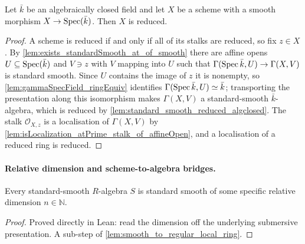 \begin{lemma}
  \label{lem:smooth_scheme_reduced_algclosed}
  Let \(\bar k\) be an algebraically closed field and let \(X\) be a scheme with
  a smooth morphism \(X \to \operatorname{Spec}(\bar k)\). Then \(X\) is reduced.
\end{lemma}

\begin{proof}
  A scheme is reduced if and only if all of its stalks are reduced, so fix
  \(z \in X\). By \cref{lem:exists_standardSmooth_at_of_smooth} there are affine
  opens \(U \subseteq \operatorname{Spec}(\bar k)\) and \(V \ni z\) with \(V\) mapping into
  \(U\) such that \(\Gamma(\operatorname{Spec} \bar k, U) \to \Gamma(X, V)\) is standard
  smooth. Since \(U\) contains the image of \(z\) it is nonempty, so
  \cref{lem:gammaSpecField_ringEquiv} identifies
  \(\Gamma(\operatorname{Spec} \bar k, U) \simeq \bar k\); transporting the presentation along
  this isomorphism makes \(\Gamma(X, V)\) a standard-smooth
  \(\bar k\)-algebra, which is reduced by
  \cref{lem:standard_smooth_reduced_algclosed}. The stalk
  \(\mathcal O_{X,z}\) is a localisation of \(\Gamma(X, V)\) by
  \cref{lem:isLocalization_atPrime_stalk_of_affineOpen}, and a localisation of
  a reduced ring is reduced.
\end{proof}

\paragraph{Relative dimension and scheme-to-algebra bridges.}

\begin{lemma}
  \label{lem:exists_standardSmoothOfRelativeDimension_of_standardSmooth}
  Every standard-smooth \(R\)-algebra \(S\) is standard smooth of some specific
  relative dimension \(n \in \mathbb N\).
\end{lemma}

\begin{proof}
  Proved directly in Lean: read the dimension off the underlying submersive
  presentation. A sub-step of \cref{lem:smooth_to_regular_local_ring}.
\end{proof}

